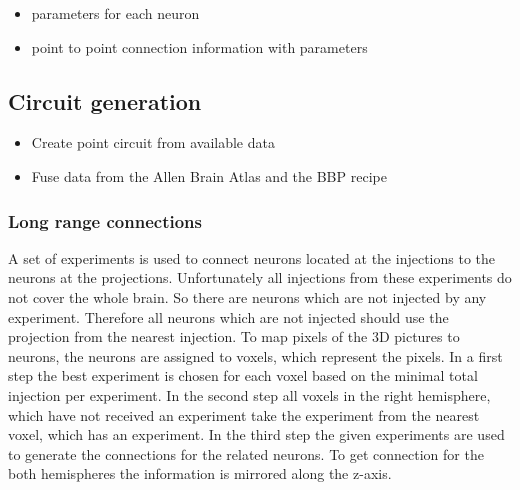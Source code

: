 \documentclass[a4paper]{article}
\begin{document}
\begin{itemize}
      \item parameters for each neuron
      \item point to point connection information with parameters
   \end{itemize}

\newpage
\subsection{Circuit generation}
\begin{itemize}
      \item Create point circuit from available data
      \item Fuse data from the Allen Brain Atlas and the BBP recipe
   \end{itemize}

\subsubsection{Long range connections}
A set of experiments is used to connect neurons located at the injections
to the neurons at the projections. Unfortunately all injections from these experiments do not
cover the whole brain. So there are neurons which are not injected
by any experiment. Therefore all neurons which are not injected should use the projection
from the nearest injection. To map pixels of the 3D pictures to neurons, the neurons are assigned to voxels, which represent the pixels. In a first step the best experiment is chosen for each voxel based on the minimal total injection per experiment. In the second step all voxels in the right hemisphere, which have not received an experiment take the experiment from the nearest voxel, which has an experiment. In the third step the given experiments are used to generate the connections for the related neurons. To get connection for the both hemispheres the information is mirrored along the z-axis.
\end{document}

